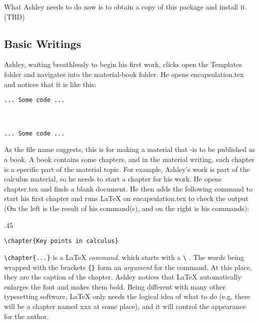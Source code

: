 \documentclass[oneside]{book}
\begin{document}
What Ashley needs to do now is to obtain a copy of this package and install it. (TBD)

\subsection{Basic Writings}
Ashley, waiting breathlessly to begin his first work, clicks open the Templates folder and navigates into the material-book folder. He opens encapsulation.tex and notices that it is like this:
\begin{lstlisting}
... Some code ...



... Some code ...
\end{lstlisting}

As the file name suggests, this is for making a material that -is to be published as a book. A book contains some chapters, and in the material writing, each chapter is a specific part of the material topic. For example, Ashley's work is part of the calculus material, so he needs to start a chapter for his work. He opens chapter.tex and finds a blank document. He then adds the following command to start his first chapter and runs \LaTeX{} on encapsulation.tex to check the output (On the left is the result of his command(s), and on the right is his commands):

\begin{miniexammar}{.45\textandmarginlen}{}
\begin{lstlisting}
\chapter{Key points in calculus}
\end{lstlisting}
\end{miniexammar}
\verb=\chapter{...}= is a \LaTeX{} \emph{command}, which starts with a \verb=\=%
. The words being wrapped with the brackets \verb={}= form an \emph{argument} for the command. At this place, they are the caption of the chapter. Ashley notices that \LaTeX{} automatically enlarges the font and makes them bold. Being different with many other typesetting software, \LaTeX{} only needs the logical idea of what to do (e.g. there will be a chapter named xxx at some place), and it will control the appearance for the author.
\end{document}
